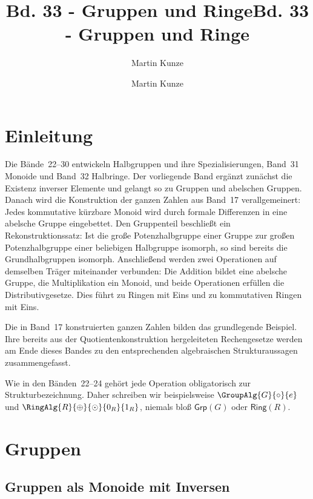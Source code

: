 \documentclass[main.tex]{subfiles}
\title{Bd. 33 - Gruppen und Ringe}
\author{Martin Kunze}
\date{}
\begin{document}
\newcommand{\BandXXIXProofRefStack}[1]{%
  \ensuremath{\begin{gathered}#1\end{gathered}}}

\title{Bd. 33 - Gruppen und Ringe}
\author{Martin Kunze}
\date{}
\hypersetup{pageanchor=false}
\maketitle
\hypersetup{pageanchor=true}
\setcounter{tocdepth}{3}
\tableofcontents
\setcounter{file}{33}
\renewcommand{\FormulaBandID}{33}

\chapter{Einleitung}

Die Bände~22--30 entwickeln Halbgruppen und ihre Spezialisierungen,
Band~31 Monoide und Band~32 Halbringe.
Der vorliegende Band ergänzt zunächst die Existenz inverser Elemente und
gelangt so zu Gruppen und abelschen Gruppen. Danach wird die Konstruktion
der ganzen Zahlen aus Band~17 verallgemeinert: Jedes kommutative kürzbare
Monoid wird durch formale Differenzen in eine abelsche Gruppe eingebettet.
Den Gruppenteil beschließt ein Rekonstruktionssatz: Ist die große
Potenzhalbgruppe einer Gruppe zur großen Potenzhalbgruppe einer beliebigen
Halbgruppe isomorph, so sind bereits die Grundhalbgruppen isomorph.
Anschließend werden zwei Operationen auf demselben Träger miteinander
verbunden: Die Addition bildet eine abelsche Gruppe, die Multiplikation ein
Monoid, und beide Operationen erfüllen die Distributivgesetze. Dies führt zu
Ringen mit Eins und zu kommutativen Ringen mit Eins.

Die in Band~17 konstruierten ganzen Zahlen bilden das grundlegende Beispiel.
Ihre bereits aus der Quotientenkonstruktion hergeleiteten Rechengesetze
werden am Ende dieses Bandes zu den entsprechenden algebraischen
Strukturaussagen zusammengefasst.

Wie in den Bänden~22--24 gehört jede Operation obligatorisch zur
Strukturbezeichnung. Daher schreiben wir beispielsweise
\(\GroupAlg{G}{\circ}{e}\) und
\(\RingAlg{R}{\oplus}{\odot}{0_R}{1_R}\), niemals bloß
\(\mathsf{Grp}(G)\) oder \(\mathsf{Ring}(R)\).

\chapter{Gruppen}

\section{Gruppen als Monoide mit Inversen}
\end{document}
